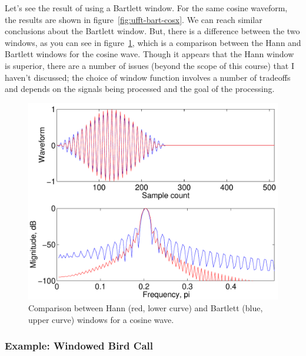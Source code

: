Let's see the result of using a Bartlett window. For the same cosine
waveform, the results are shown in figure~\ref{fig:ufft-bart-cosx}.
We can reach similar conclusions about the Bartlett window. But, there
is a difference between the two windows, as you can see in
figure~\ref{fig:ufft-hnba-cosx}, which is a comparison between the
Hann and Bartlett windows for the cosine wave. Though it appears that
the Hann window is superior, there are a number of issues (beyond the
scope of this course) that I haven't discussed; the choice of window
function involves a number of tradeoffs and depends on the signals
being processed and the goal of the processing.

\begin{figure}
\centerline{\includegraphics[height=0.35\textheight]{ch-fft/ufft_hannbartl_cosx512_256}}
\caption[Comparison between Hann and Bartlett windows for
a cosine wave]{Comparison between Hann (red, lower curve) and Bartlett
(blue, upper curve) windows for a cosine
wave.\label{fig:ufft-hnba-cosx}}
\end{figure}

\subsubsection{Example: Windowed Bird Call}

